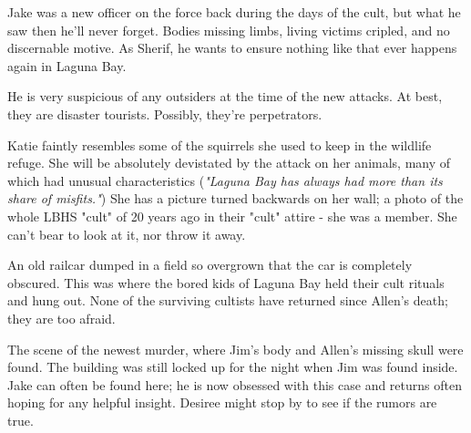 \documentclass{motw}
\begin{document}

Jake was a new officer on the force back during the days of the cult, but what he saw then he'll never forget.  Bodies missing limbs, living victims cripled, and no discernable motive.  As Sherif, he wants to ensure nothing like that ever happens again in Laguna Bay.

He is very suspicious of any outsiders at the time of the new attacks.  At best, they are disaster tourists.  Possibly, they're perpetrators.


Katie faintly resembles some of the squirrels she used to keep in the wildlife refuge.  She will be absolutely devistated by the attack on her animals, many of which had unusual characteristics (\emph{"Laguna Bay has always had more than its share of misfits."})  She has a picture turned backwards on her wall; a photo of the whole LBHS "cult" of 20 years ago in their "cult" attire - she was a member.  She can't bear to look at it, nor throw it away.



An old railcar dumped in a field so overgrown that the car is completely obscured.  This was where the bored kids of Laguna Bay held their cult rituals and hung out.  None of the surviving cultists have returned since Allen's death; they are too afraid.


The scene of the newest murder, where Jim's body and Allen's missing skull were found.  The building was still locked up for the night when Jim was found inside.  Jake can often be found here; he is now obsessed with this case and returns often hoping for any helpful insight. Desiree might stop by to see if the rumors are true.

\end{document}
